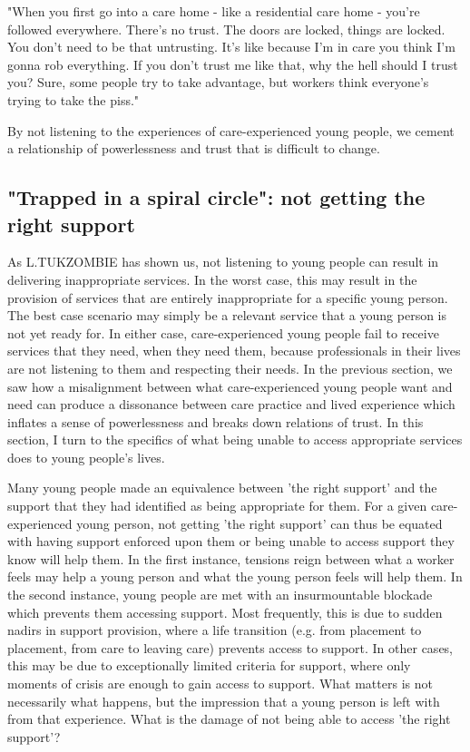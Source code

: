 "When you first go into a care home - like a residential care home - you're followed everywhere. There's no trust. The doors are locked, things are locked. You don't need to be that untrusting. It's like because I'm in care you think I'm gonna rob everything. If you don't trust me like that, why the hell should I trust you? Sure, some people try to take advantage, but workers think everyone's trying to take the piss."

By not listening to the experiences of care-experienced young people, we cement a relationship of powerlessness and trust that is difficult to change.

\subsection{"Trapped in a spiral circle": not getting the right support}
As L.TUKZOMBIE has shown us, not listening to young people can result in delivering inappropriate services. In the worst case, this may result in the provision of services that are entirely inappropriate for a specific young person. The best case scenario may simply be a relevant service that a young person is not yet ready for. In either case, care-experienced young people fail to receive services that they need, when they need them, because professionals in their lives are not listening to them and respecting their needs. In the previous section, we saw how a misalignment between what care-experienced young people want and need can produce a dissonance between care practice and lived experience which inflates a sense of powerlessness and breaks down relations of trust. In this section, I turn to the specifics of what being unable to access appropriate services does to young people's lives.

Many young people made an equivalence between 'the right support' and the support that they had identified as being appropriate for them. For a given care-experienced young person, not getting 'the right support' can thus be equated with having support enforced upon them or being unable to access support they know will help them. In the first instance, tensions reign between what a worker feels may help a young person and what the young person feels will help them. In the second instance, young people are met with an insurmountable blockade which prevents them accessing support. Most frequently, this is due to sudden nadirs in support provision, where a life transition (e.g. from placement to placement, from care to leaving care) prevents access to support. In other cases, this may be due to exceptionally limited criteria for support, where only moments of crisis are enough to gain access to support. What matters is not necessarily what happens, but the impression that a young person is left with from that experience. What is the damage of not being able to access 'the right support'?

